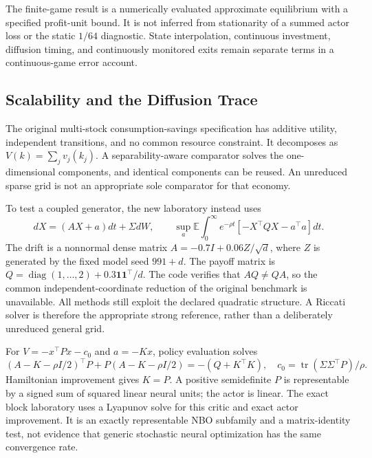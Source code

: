 \documentclass[ecta,nameyear,draft]{econsocart}
\theoremstyle{definition}
\theoremstyle{remark}
\newcommand{\E}{\mathbb E}
\newcommand{\tr}{\operatorname{tr}}
\begin{document}
The finite-game result is a numerically evaluated approximate equilibrium with a specified profit-unit bound. It is not inferred from stationarity of a summed actor loss or the static $1/64$ diagnostic. State interpolation, continuous investment, diffusion timing, and continuously monitored exits remain separate terms in a continuous-game error account.



\subsection{Scalability and the Diffusion Trace}\label{sec:scaling}
The original multi-stock consumption-savings specification has additive utility, independent transitions, and no common resource constraint. It decomposes as $V(k)=\sum_jv_j(k_j)$. A separability-aware comparator solves the one-dimensional components, and identical components can be reused. An unreduced sparse grid is not an appropriate sole comparator for that economy.

To test a coupled generator, the new laboratory instead uses
\begin{equation}\label{eq:lq}
 dX=(AX+a)dt+\Sigma dW,\qquad
 \sup_a\E\int_0^\infty e^{-\rho t}[-X^\top QX-a^\top a]dt.
\end{equation}
The drift is a nonnormal dense matrix $A=-0.7I+0.06Z/\sqrt d$, where $Z$ is generated by the fixed model seed $991+d$. The payoff matrix is $Q=\operatorname{diag}(1,\ldots,2)+0.3\bm1\bm1^\top/d$. The code verifies that $AQ\ne QA$, so the common independent-coordinate reduction of the original benchmark is unavailable. All methods still exploit the declared quadratic structure. A Riccati solver is therefore the appropriate strong reference, rather than a deliberately unreduced general grid.

For $V=-x^\top Px-c_0$ and $a=-Kx$, policy evaluation solves
\begin{equation}\label{eq:lyapunov}
 (A-K-\rho I/2)^\top P+P(A-K-\rho I/2)=-(Q+K^\top K),
 \quad c_0=\tr(\Sigma\Sigma^\top P)/\rho.
\end{equation}
Hamiltonian improvement gives $K=P$. A positive semidefinite $P$ is representable by a signed sum of squared linear neural units; the actor is linear. The exact block laboratory uses a Lyapunov solve for this critic and exact actor improvement. It is an exactly representable NBO subfamily and a matrix-identity test, not evidence that generic stochastic neural optimization has the same convergence rate.
\end{document}
